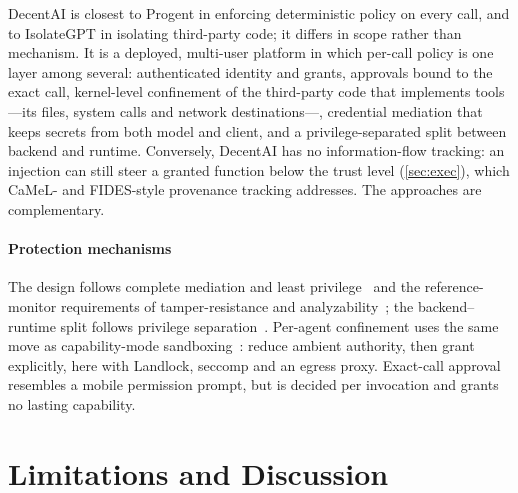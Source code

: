\documentclass[10pt,twocolumn,a4paper]{article}
\newcommand{\sys}{DecentAI}
\begin{document}
\sys{} is closest to Progent in enforcing deterministic policy on
every call, and to IsolateGPT in isolating third-party code; it differs
in scope rather than mechanism. It is a deployed, multi-user platform
in which per-call policy is one layer among several: authenticated
identity and grants, approvals bound to the exact call, kernel-level
confinement of the third-party code that implements tools---its files,
system calls and network destinations---, credential mediation that keeps secrets from
both model and client, and a privilege-separated split between backend
and runtime. Conversely, \sys{} has no information-flow tracking: an
injection can still steer a granted function below the trust level
(\cref{sec:exec}), which CaMeL- and FIDES-style provenance tracking
addresses. The approaches are complementary.

\paragraph{Protection mechanisms}
The design follows complete mediation and least
privilege~\cite{saltzer1975protection} and the reference-monitor
requirements of tamper-resistance and analyzability~\cite{anderson1972planning};
the backend--runtime split follows privilege
separation~\cite{provos2003privsep}. Per-agent confinement uses the
same move as capability-mode sandboxing~\cite{watson2010capsicum}:
reduce ambient authority, then grant explicitly, here with Landlock,
seccomp and an egress proxy. Exact-call approval resembles a mobile
permission prompt, but is decided per invocation and grants no lasting
capability.

\section{Limitations and Discussion}
\label{sec:limits}
\end{document}
